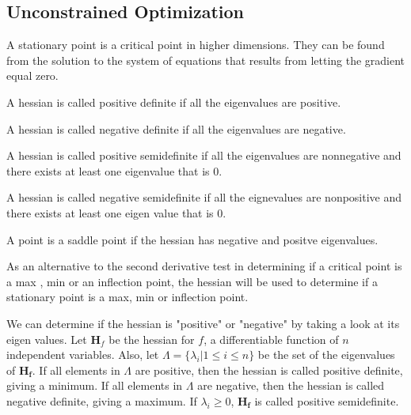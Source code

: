\documentclass[12pt]{scrartcl}
\begin{document}
\subsection{Unconstrained Optimization}
\begin{definition}
    A \alert{stationary point} is a critical point in higher dimensions. They
    can be found from the solution to the system of equations that results
    from letting the gradient equal zero.
\end{definition}
\begin{definition}
    A hessian is called \alert{positive definite} if all the eigenvalues
    are positive.
\end{definition}
\begin{definition}
    A hessian is called \alert{negative definite} if all the eigenvalues
    are negative.
\end{definition}
\begin{definition}
    A hessian is called \alert{positive semidefinite} if all the eigenvalues
    are nonnegative and there exists at least one eigenvalue that is $0$.
\end{definition}
\begin{definition}
    A hessian is called \alert{negative semidefinite} if all the eignevalues
    are nonpositive and there exists at least one eigen value that is $0$.
\end{definition}
\begin{definition}
    A point is a \alert{saddle point} if the hessian has negative and positve
    eigenvalues.
\end{definition}
As an alternative to the second derivative test in determining if a critical
point is a max , min or an inflection point, the \alert{hessian} will be used 
to determine if a stationary point is a max, min or inflection point.
\begin{theorem}

\end{theorem}
We can determine if the hessian is "positive" or "negative" by taking a look
at its eigen values. Let $\mathbf{H}_f$ be the hessian for $f$, a differentiable
function of $n$ independent variables. Also, let $\Lambda = \{\lambda_i | 1 \leq i \leq n\}$
be the set of the eigenvalues of $\mathbf{H_f}$. If all elements in $\Lambda$ are positive,
then the hessian is called \alert{positive definite}, giving a minimum. If all 
elements in $\Lambda$ are negative, then the hessian is called \alert{negative definite},
giving a maximum. If $\lambda_i \geq 0$, $\mathbf{H_f}$ is called \alert{positive semidefinite}.
\end{document}
